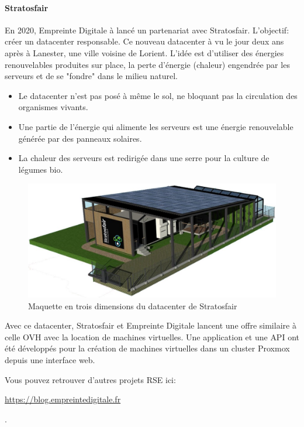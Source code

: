 \documentclass[12pt]{article}
\begin{document}
\paragraph{Stratosfair}
En 2020, Empreinte Digitale à lancé un partenariat avec Stratosfair. 
L'objectif: créer un datacenter responsable. 
Ce nouveau datacenter à vu le jour deux ans après à Lanester, une ville voisine de Lorient. 
L'idée est d'utiliser des énergies renouvelables produites sur place, la perte d'énergie (chaleur) engendrée par les serveurs et de se "fondre" dans le milieu naturel.
\begin{itemize}
    \item Le datacenter n'est pas posé à même le sol, ne bloquant pas la circulation des organismes vivants.
    \item Une partie de l'énergie qui alimente les serveurs est une énergie renouvelable générée par des panneaux solaires.
    \item La chaleur des serveurs est redirigée dans une serre pour la culture de légumes bio.
\end{itemize}

\begin{figure}[!ht]
    \centering
    \includegraphics[width=\textwidth]{src/scheme_strato.jpg}
    \caption{Maquette en trois dimensions du datacenter de Stratosfair}
    \label{fig:strato}
\end{figure}

Avec ce datacenter, Stratosfair et Empreinte Digitale lancent une offre similaire à celle OVH avec la location de machines virtuelles.
Une application et une \gls{API} ont été développés pour la création de machines virtuelles dans un \gls{cluster} \gls{Proxmox} depuis une interface web.

Vous pouvez retrouver d'autres projets \gls{RSE} ici: \begin{hilite} \url{https://blog.empreintedigitale.fr} \end{hilite}.
\end{document}
